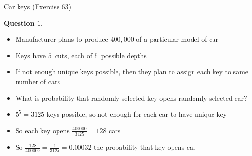 \documentclass{beamer}
\theoremstyle{definition}
\newtheorem{question}{Question}
\begin{document}
\begin{frame}{Car keys (Exercise 63)}
\begin{question}
\begin{itemize}
\item Manufacturer plans to produce $400,000$ of a particular
model of car
\item Keys have $5$~cuts, each of $5$~possible depths
\item If not enough unique keys possible, then they plan to assign
each key to same number of cars
\item What is probability that randomly selected key
opens randomly selected car?
\end{itemize}
\end{question}
\begin{itemize}
\item $5^5=3125$ keys possible, so not enough for each car to have unique key
\item So each key opens $\frac{400000}{3125}=128$ cars
\item So $\frac{128}{400000}=\frac{1}{3125}=0.00032$
the probability that key opens car
\end{itemize}
\end{frame}
\end{document}
